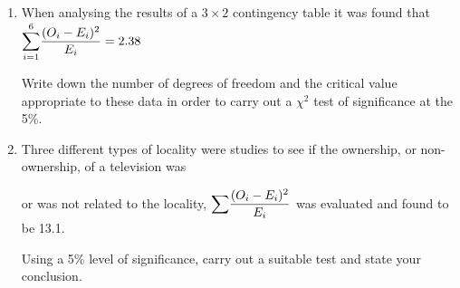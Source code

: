 \documentclass[fleqn]{article}
\begin{document}
\exercise{}
\begin{enumerate}
    \setlength\itemsep{0.5em}
    \item When analysing the results of a $3\times 2$ contingency table it was found that\vspace{2mm}\\
        ${\mathlarger\sum _{i=1}^{6}}\dfrac{( O_{i} -E_{i})^{2}}{E_{i}}=2.38$ \vspace{2mm}
        
        Write down the number of degrees of freedom and the critical value appropriate to these data in order to carry out a $\chi^2$ test of significance at the 5\%.
    
    \item Three different types of locality were studies to see if the ownership, or non-ownership, of a  television was \par
        or was not related to the locality, ${\mathlarger\sum}\dfrac{( O_{i} -E_{i})^{2}}{E_{i}}$ was evaluated and found to be 13.1. \par
        Using a 5\% level of significance, carry out a suitable test and state your conclusion.
        

\end{enumerate}
\end{document}
